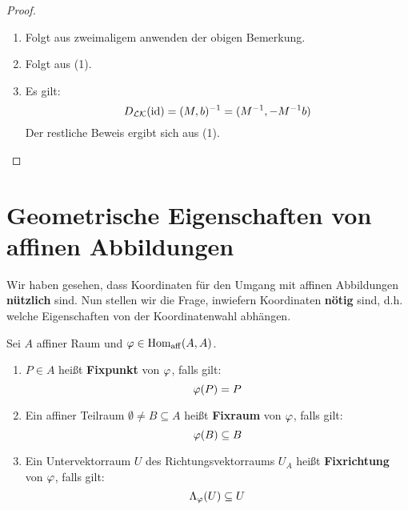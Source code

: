 \documentclass[parskip,a4paper,twoside,DIV15,BCOR12mm]{scrbook}
\begin{document}
\begin{proof}
\begin{enumerate}
\item Folgt aus zweimaligem anwenden der obigen Bemerkung.
\item Folgt aus (1).
\item Es gilt:
\[D_{\mathcal{LK}}(\operatorname{id})=(M,b)^{-1}=(M^{-1},-M^{-1}b)\]
Der restliche Beweis ergibt sich aus (1).
\end{enumerate}
\end{proof}

\section{Geometrische Eigenschaften von affinen Abbildungen}
Wir haben gesehen, dass Koordinaten für den Umgang mit affinen Abbildungen \textbf{nützlich}
sind. Nun stellen wir die Frage, inwiefern Koordinaten \textbf{nötig} sind, d.h.
welche Eigenschaften von der Koordinatenwahl abhängen.

\begin{definition}
\renewcommand{\labelenumi}{(\alph{enumi})}
Sei $A$ affiner Raum und $\varphi\in\operatorname{Hom_{aff}}(A,A)$.
\begin{enumerate}
\item $P\in A$ heißt \textbf{Fixpunkt} von $\varphi$, falls gilt:
\[\varphi(P)=P\]
\item Ein affiner Teilraum $\emptyset\ne B\subseteq A$ heißt \textbf{Fixraum} 
von $\varphi$, falls gilt:
\[\varphi(B)\subseteq B\]
\item Ein Untervektorraum $U$ des Richtungsvektorraums $U_A$ heißt \textbf{Fixrichtung}
von $\varphi$, falls gilt:
\[\Lambda_\varphi(U)\subseteq U\]
\end{enumerate}
\renewcommand{\labelenumi}{(\arabic{enumi})}
\end{definition}
\end{document}

